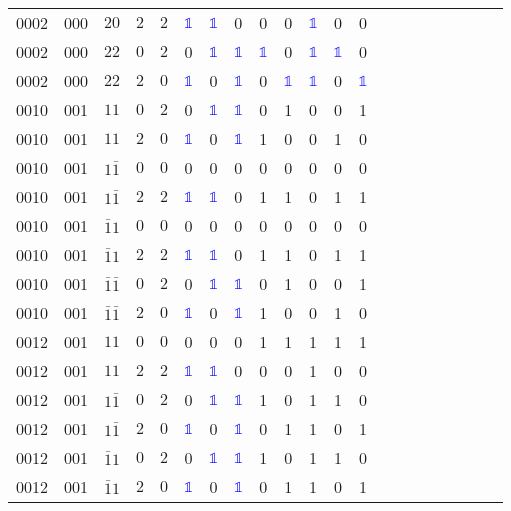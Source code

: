 \begin{longtable*}{c| cccccccccccccccccccc }
0002& 000& $20$& $2$& $2$& \textcolor{blue}{$\mathds{1}$}& \textcolor{blue}{$\mathds{1}$}& 0& 0& 0& \textcolor{blue}{$\mathds{1}$}& 0& 0\\
0002& 000& $22$& $0$& $2$& 0& \textcolor{blue}{$\mathds{1}$}& \textcolor{blue}{$\mathds{1}$}& \textcolor{blue}{$\mathds{1}$}& 0& \textcolor{blue}{$\mathds{1}$}& \textcolor{blue}{$\mathds{1}$}& 0\\
0002& 000& $22$& $2$& $0$& \textcolor{blue}{$\mathds{1}$}& 0& \textcolor{blue}{$\mathds{1}$}& 0& \textcolor{blue}{$\mathds{1}$}& \textcolor{blue}{$\mathds{1}$}& 0& \textcolor{blue}{$\mathds{1}$}\\
0010& 001& $11$& $0$& $2$& 0& \textcolor{blue}{$\mathds{1}$}& \textcolor{blue}{$\mathds{1}$}& 0& 1& 0& 0& 1\\
0010& 001& $11$& $2$& $0$& \textcolor{blue}{$\mathds{1}$}& 0& \textcolor{blue}{$\mathds{1}$}& 1& 0& 0& 1& 0\\
0010& 001& $1\bar{1}$& $0$& $0$& 0& 0& 0& 0& 0& 0& 0& 0\\
0010& 001& $1\bar{1}$& $2$& $2$& \textcolor{blue}{$\mathds{1}$}& \textcolor{blue}{$\mathds{1}$}& 0& 1& 1& 0& 1& 1\\
0010& 001& $\bar{1}1$& $0$& $0$& 0& 0& 0& 0& 0& 0& 0& 0\\
0010& 001& $\bar{1}1$& $2$& $2$& \textcolor{blue}{$\mathds{1}$}& \textcolor{blue}{$\mathds{1}$}& 0& 1& 1& 0& 1& 1\\
0010& 001& $\bar{1}\bar{1}$& $0$& $2$& 0& \textcolor{blue}{$\mathds{1}$}& \textcolor{blue}{$\mathds{1}$}& 0& 1& 0& 0& 1\\
0010& 001& $\bar{1}\bar{1}$& $2$& $0$& \textcolor{blue}{$\mathds{1}$}& 0& \textcolor{blue}{$\mathds{1}$}& 1& 0& 0& 1& 0\\
0012& 001& $11$& $0$& $0$& 0& 0& 0& 1& 1& 1& 1& 1\\
0012& 001& $11$& $2$& $2$& \textcolor{blue}{$\mathds{1}$}& \textcolor{blue}{$\mathds{1}$}& 0& 0& 0& 1& 0& 0\\
0012& 001& $1\bar{1}$& $0$& $2$& 0& \textcolor{blue}{$\mathds{1}$}& \textcolor{blue}{$\mathds{1}$}& 1& 0& 1& 1& 0\\
0012& 001& $1\bar{1}$& $2$& $0$& \textcolor{blue}{$\mathds{1}$}& 0& \textcolor{blue}{$\mathds{1}$}& 0& 1& 1& 0& 1\\
0012& 001& $\bar{1}1$& $0$& $2$& 0& \textcolor{blue}{$\mathds{1}$}& \textcolor{blue}{$\mathds{1}$}& 1& 0& 1& 1& 0\\
0012& 001& $\bar{1}1$& $2$& $0$& \textcolor{blue}{$\mathds{1}$}& 0& \textcolor{blue}{$\mathds{1}$}& 0& 1& 1& 0& 1\\

\end{longtable*}
